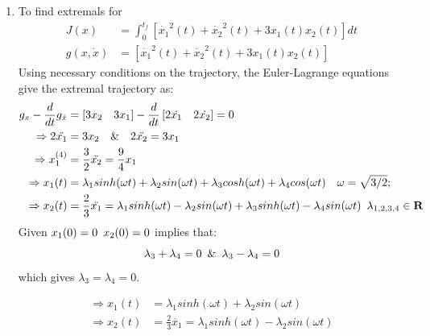 \begin{enumerate}
  \item To find extremals for 
  \begin{align*}
    J(x) &= \int_0^{t_f} [{\dot{x_1}}^2(t) + {\dot{x_2}}^2(t) + 3 x_1(t) x_2(t) ] dt\\
    g(x,\dot{x}) &= [{\dot{x_1}}^2(t) + {\dot{x_2}}^2(t) + 3 x_1(t) x_2(t) ]
  \end{align*}
  Using necessary conditions on the trajectory, the Euler-Lagrange equations give the extremal trajectory as:
  \begin{align*}
  g_x - \frac{d}{dt} g_{\dot x}  &= \left[ 3 x_2 \quad 3 x_1\right] - \frac{d}{dt} \left[ 2 \dot{x_1}\quad 2\dot{x_2}\right] = 0\\
  \Rightarrow 2 \ddot{x_1} &= 3 x_2 \quad \& \quad 2 \ddot{x_2} = 3 x_1 \\
  \Rightarrow x_1^{(4)} &= \frac{3}{2} \ddot{x_2} = \frac{9}{4} x_1 \\
  \Rightarrow x_1(t) &= \lambda_1 sinh(\omega t) + \lambda_2 sin(\omega t) + \lambda_3 cosh(\omega t) + \lambda_4 cos(\omega t) \quad \omega = \sqrt{3/2};\\
  \Rightarrow x_2(t) &= \frac{2}{3} \ddot{x_1} = \lambda_1 sinh(\omega t) - \lambda_2 sin(\omega t) + \lambda_3 sinh(\omega t) - \lambda_4 sin(\omega t) \enskip \lambda_{1,2,3,4} \in \mathbf{R}\\
  \end{align*}
  Given $x_1(0) = 0 \enskip x_2(0) = 0$ implies that:
  \begin{equation*}
   \lambda_3 + \lambda_4 = 0 \enskip \& \enskip \lambda_3 - \lambda_4 = 0
  \end{equation*}
  which gives $\lambda_3 = \lambda_4 = 0$.
  
  \begin{align}
  \Rightarrow x_1(t) &= \lambda_1 sinh(\omega t) + \lambda_2 sin(\omega t) \label{eqn:2.axt}\\
  \Rightarrow x_2(t) &= \frac{2}{3} \ddot{x_1} = \lambda_1 sinh(\omega t) - \lambda_2 sin(\omega t) \label{eqn:2.bxt} 
  \end{align}


\end{enumerate}
